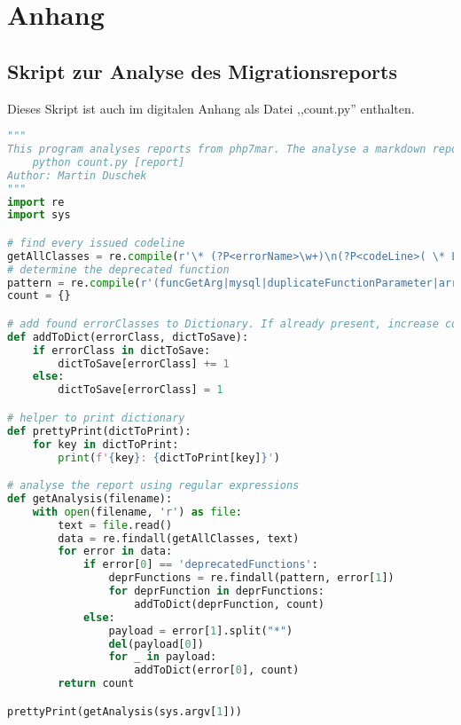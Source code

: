 \chapter{Anhang}
\section{Skript zur Analyse des Migrationsreports}\label{analysePy}
Dieses Skript ist auch im digitalen Anhang als Datei ,,count.py'' enthalten.
\begin{lstlisting}[language=python, caption={Skript zur Analyse des Migrationsreports}, label={lst:pyanalyse}]
"""
This program analyses reports from php7mar. The analyse a markdown report issue the command:
    python count.py [report]
Author: Martin Duschek
"""
import re
import sys

# find every issued codeline
getAllClasses = re.compile(r'\* (?P<errorName>\w+)\n(?P<codeLine>( \* Line.*\n)*)')
# determine the deprecated function
pattern = re.compile(r'(funcGetArg|mysql|duplicateFunctionParameter|arrayValueByReference|magic_quotes_runtime|invalidList|ereg|split|oldClassConstructors|static|variableInterpolation|foreachByReference|arrayValueByReference|newOperatorWithReference|pregEval)')
count = {}

# add found errorClasses to Dictionary. If already present, increase counter
def addToDict(errorClass, dictToSave):
    if errorClass in dictToSave:
        dictToSave[errorClass] += 1
    else:
        dictToSave[errorClass] = 1

# helper to print dictionary
def prettyPrint(dictToPrint):
    for key in dictToPrint:
        print(f'{key}: {dictToPrint[key]}')

# analyse the report using regular expressions
def getAnalysis(filename):
    with open(filename, 'r') as file:
        text = file.read()
        data = re.findall(getAllClasses, text)
        for error in data:
            if error[0] == 'deprecatedFunctions':
                deprFunctions = re.findall(pattern, error[1])
                for deprFunction in deprFunctions:
                    addToDict(deprFunction, count)
            else:
                payload = error[1].split("*")
                del(payload[0])
                for _ in payload:
                    addToDict(error[0], count)
        return count

prettyPrint(getAnalysis(sys.argv[1]))
\end{lstlisting}